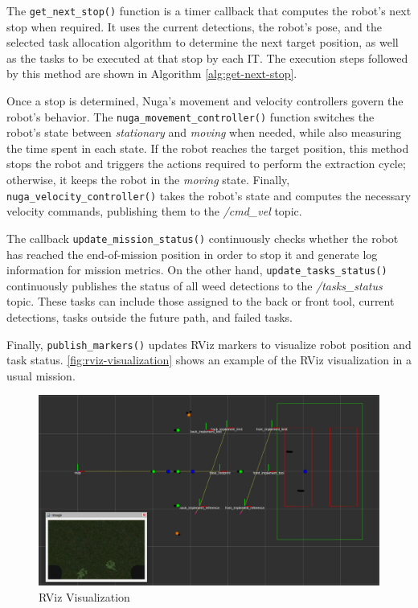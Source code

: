 The \texttt{get\_next\_stop()} function is a timer callback that computes the robot's next stop when required. It uses the current detections, the robot's pose, and the selected task allocation algorithm to determine the next target position, as well as the tasks to be executed at that stop by each \ac{IT}. The execution steps followed by this method are shown in Algorithm \ref{alg:get-next-stop}.

Once a stop is determined, Nuga’s movement and velocity controllers govern the robot’s behavior. The \texttt{nuga\_movement\_controller()} function switches the robot’s state between \textit{stationary} and \textit{moving} when needed, while also measuring the time spent in each state. If the robot reaches the target position, this method stops the robot and triggers the actions required to perform the extraction cycle; otherwise, it keeps the robot in the \textit{moving} state. Finally, \texttt{nuga\_velocity\_controller()} takes the robot’s state and computes the necessary velocity commands, publishing them to the \textit{/cmd\_vel} topic.

The callback \texttt{update\_mission\_status()} continuously checks whether the robot has reached the end-of-mission position in order to stop it and generate log information for mission metrics. On the other hand, \texttt{update\_tasks\_status()} continuously publishes the status of all weed detections to the \textit{/tasks\_status} topic. These tasks can include those assigned to the back or front tool, current detections, tasks outside the future path, and failed tasks.

Finally, \texttt{publish\_markers()} updates RViz markers to visualize robot position and task status. \autoref{fig:rviz-visualization} shows an example of the RViz visualization in a usual mission.

\begin{figure}[H]
    \centering
    \includegraphics[width=0.95\linewidth]{gfx/ch03/rviz_black_1.png}
    \caption{RViz Visualization}
    \label{fig:rviz-visualization}
\end{figure}

